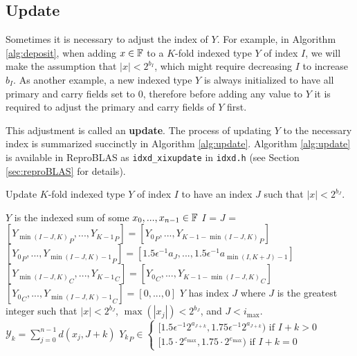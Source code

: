 \subsection{Update}
    \label{sec:primitiveops_update}
    Sometimes it is necessary to adjust the index of $Y$. For example, in Algorithm \ref{alg:deposit}, when adding $x \in \mathbb{F}$ to a $K$-fold
    indexed type $Y$ of index $I$, we will make the assumption that $|x| < 2^{b_I}$,
    which might require decreasing $I$ to increase $b_I$.
    As another example, a new indexed type $Y$ is always initialized to have all primary
    and carry fields set to 0, therefore before adding any value to $Y$
    it is required to adjust the primary and carry fields of $Y$ first.

    This adjustment is called an \textbf{update}.
    The process of updating $Y$ to the necessary index is summarized succinctly
    in Algorithm \ref{alg:update}. Algorithm \ref{alg:update} is available in ReproBLAS as \texttt{idxd\_xixupdate} in \texttt{idxd.h} (see Section \ref{sec:reproBLAS} for details).

    \begin{samepage}
    \begin{alg}
      Update $K$-fold indexed type $Y$ of index $I$ to have an index $J$ such that $|x| < 2^{b_J}$.
      \begin{algorithmic}[1]
        \Require
          \Statex $Y$ is the indexed sum of some $x_0, ..., x_{n - 1} \in \mathbb{F}$
          \State $I$ = 
          \State $J$ = 
            \State $[{Y_{\min(I - J, K)}}_P, ..., {Y_{K - 1}}_P] = [{Y_0}_P, ..., {Y_{K - 1 - \min(I - J, K)}}_P]$
            \State $[{Y_0}_P, ..., {Y_{\min(I - J, K) - 1}}_P] = [1.5  \epsilon^{-1}  a_{J}, ..., 1.5  \epsilon^{-1}  a_{\min(I, K + J) - 1}]$
            \State $[{Y_{\min(I - J, K)}}_C, ..., {Y_{K - 1}}_C] = [{Y_0}_C, ..., {Y_{K - 1 - \min(I - J, K)}}_C]$
            \State $[{Y_0}_C, ..., {Y_{\min(I - J, K) - 1}}_C] = [0, ..., 0]$
          \EndIf
        \EndFunction
        \Ensure
          \Statex $Y$ has index $J$ where $J$ is the greatest integer such that $|x| < 2^{b_J}$, $\max(|x_j|) < 2^{b_J}$, and $J < i_{\max}$.
          \Statex $\mathcal{Y}_k = \sum\limits_{j = 0}^{n - 1} d(x_j, J + k)$
          \Statex ${Y_k}_P \in \begin{cases}[1.5  \epsilon^{-1} 2^{a_{J + k}}, 1.75  \epsilon^{-1} 2^{a_{J + k}}) \text{ if } I + k > 0 \\ [1.5 \cdot 2^{e_{\max}}, 1.75 \cdot 2^{e_{\max}}) \text{ if } I + k = 0\end{cases}$
      \end{algorithmic}
      \label{alg:update}
    \end{alg}
    \end{samepage}

